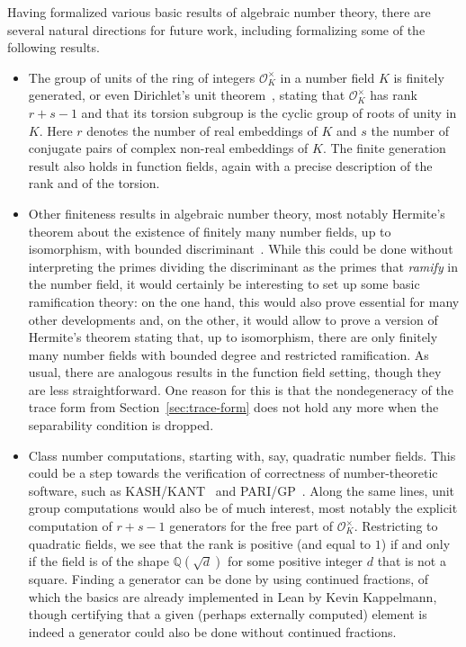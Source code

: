 \documentclass[sn-mathphys]{sn-jnl}%
\newcommand*{\OK}[1][K]{\mathcal{O}_{#1}}
\newcommand{\QQ}{\mathbb{Q}}
\begin{document}
Having formalized various basic results of algebraic number theory, there are several natural directions for future work, including formalizing some of the following results.
\begin{itemize}

\item The group of units of the ring of integers $\OK^{\times}$ in a number field $K$ is finitely generated, or even Dirichlet's unit theorem~\cite[Theorem 7.4]{Neukirch}, stating that $\OK^{\times}$ has rank $r+s-1$ and that its torsion subgroup is the cyclic group of roots of unity in $K$. Here $r$ denotes the number of real embeddings of $K$ and $s$ the number of conjugate pairs of complex non-real embeddings of $K$. The finite generation result also holds in function fields, again with a precise description of the rank and of the torsion.

\item Other finiteness results in algebraic number theory, most notably Hermite's theorem about the existence of finitely many number fields, up to isomorphism,
with bounded discriminant~\cite[Theorem 2.16]{Neukirch}. While this could be done without interpreting the primes dividing the discriminant as the primes that \emph{ramify} in the number field, it would certainly be interesting to set up some basic ramification theory: on the one hand, this would also prove essential for many other developments and, on the other, it would allow to prove a version of Hermite's theorem stating that, up to isomorphism, there are only finitely many number fields with bounded degree and restricted ramification.
As usual, there are analogous results in the function field setting, though they are less straightforward. One reason for this is that the nondegeneracy of the trace form from Section~\ref{sec:trace-form} does not hold any more when the separability condition is dropped.

\item Class number computations, starting with, say, quadratic number fields.
This could be a step towards the verification of correctness of number-theoretic software, such as KASH/KANT~\cite{kash} and PARI/GP~\cite{PARI2}.
Along the same lines, unit group computations would also be of much interest, most notably the explicit computation of $r+s-1$ generators for the free part of $\OK^{\times}$. %
Restricting to quadratic fields, we see that the rank is positive (and equal to $1$) if and only if the field is of the shape $\QQ(\sqrt{d})$ for some positive integer $d$ that is not a square.
Finding a generator can %
be done by using continued fractions, of which the basics are already implemented in Lean by Kevin Kappelmann, though certifying that a given (perhaps externally computed) element is indeed a generator could also be done without continued fractions.


\end{itemize}
\end{document}
